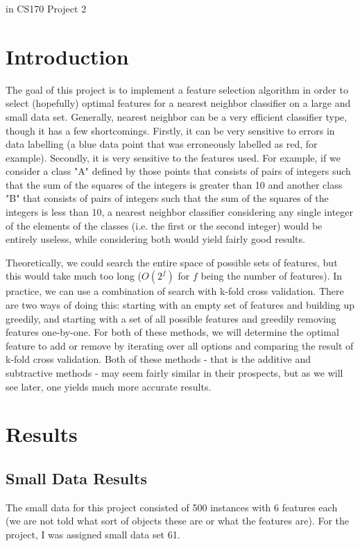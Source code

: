 \documentclass{article}
\date{}
\begin{document}
{\LARGE{ in CS170 Project 2}}
\vskip 0.5in
{}
{}
{}
{}
\vskip 0.5in
\tableofcontents
\listoffigures
\pagebreak
\section{Introduction}
The goal of this project is to implement a feature selection algorithm in order to select (hopefully) optimal features for a nearest neighbor classifier on a large and small data set. Generally, nearest neighbor can be a very efficient classifier type, though it has a few shortcomings. Firstly, it can be very sensitive to errors in data labelling (a blue data point that was erroneously labelled as red, for example). Secondly, it is very sensitive to the features used. For example, if we consider a class "A" defined by those points that consists of pairs of integers such that the sum of the squares of the integers is greater than 10 and another class "B" that consists of pairs of integers such that the sum of the squares of the integers is less than 10, a nearest neighbor classifier considering any single integer of the elements of the classes (i.e. the first or the second integer) would be entirely useless, while considering both would yield fairly good results.
\par Theoretically, we could search the entire space of possible sets of features, but this would take much too long ($O(2^f)$ for $f$ being the number of features). In practice, we can use a combination of search with k-fold cross validation. There are two ways of doing this: starting with an empty set of features and building up greedily, and starting with a set of all possible features and greedily removing features one-by-one. For both of these methods, we will determine the optimal feature to add or remove by iterating over all options and comparing the result of k-fold cross validation. Both of these methods - that is the additive and subtractive methods - may seem fairly similar in their prospects, but as we will see later, one yields much more accurate results.
\section{Results}
\subsection{Small Data Results}
The small data for this project consisted of 500 instances with 6 features each (we are not told what sort of objects these are or what the features are). For the project, I was assigned small data set 61.
\end{document}
